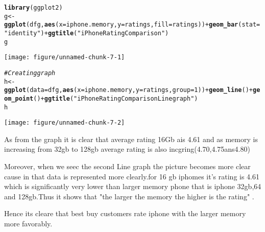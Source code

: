 \documentclass{article}\usepackage[]{graphicx}\usepackage[]{color}
\makeatletter
\def\maxwidth{ %
  \ifdim\Gin@nat@width>\linewidth
    \linewidth
  \else
    \Gin@nat@width
  \fi
}
\newcommand{\hlnum}[1]{\textcolor[rgb]{0.686,0.059,0.569}{#1}}%
\newcommand{\hlstr}[1]{\textcolor[rgb]{0.192,0.494,0.8}{#1}}%
\newcommand{\hlcom}[1]{\textcolor[rgb]{0.678,0.584,0.686}{\textit{#1}}}%
\newcommand{\hlopt}[1]{\textcolor[rgb]{0,0,0}{#1}}%
\newcommand{\hlstd}[1]{\textcolor[rgb]{0.345,0.345,0.345}{#1}}%
\newcommand{\hlkwb}[1]{\textcolor[rgb]{0.69,0.353,0.396}{#1}}%
\newcommand{\hlkwc}[1]{\textcolor[rgb]{0.333,0.667,0.333}{#1}}%
\newcommand{\hlkwd}[1]{\textcolor[rgb]{0.737,0.353,0.396}{\textbf{#1}}}%
\newenvironment{kframe}{%
 \def\at@end@of@kframe{}%
 \ifinner\ifhmode%
  \def\at@end@of@kframe{\end{minipage}}%
  \begin{minipage}{\columnwidth}%
 \fi\fi%
 \def\FrameCommand##1{\hskip\@totalleftmargin \hskip-\fboxsep
 \colorbox{shadecolor}{##1}\hskip-\fboxsep
     \hskip-\linewidth \hskip-\@totalleftmargin \hskip\columnwidth}%
 \MakeFramed {\advance\hsize-\width
   \@totalleftmargin\z@ \linewidth\hsize
   \@setminipage}}%
 {\par\unskip\endMakeFramed%
 \at@end@of@kframe}
\newenvironment{knitrout}{}{} %
\makeatother
\begin{document}
\begin{knitrout}
\color{fgcolor}\begin{kframe}
\begin{alltt}
\hlkwd{library}\hlstd{(ggplot2)}
\hlstd{g}\hlkwb{<-}\hlkwd{ggplot}\hlstd{(dfg,}\hlkwd{aes}\hlstd{(}\hlkwc{x}\hlstd{=iphone.memory,}\hlkwc{y}\hlstd{=ratings,}\hlkwc{fill}\hlstd{=ratings))}\hlopt{+}\hlkwd{geom_bar}\hlstd{(}\hlkwc{stat}\hlstd{=}\hlstr{"identity"}\hlstd{)}\hlopt{+}\hlkwd{ggtitle}\hlstd{(}\hlstr{"iPhone Rating Comparison"}\hlstd{)}
\hlstd{g}
\end{alltt}
\end{kframe}
\texttt{[image: figure/unnamed-chunk-7-1]} 
\begin{kframe}\begin{alltt}
\hlcom{#Creating graph}
\hlstd{h}\hlkwb{<-}\hlkwd{ggplot}\hlstd{(}\hlkwc{data}\hlstd{=dfg,} \hlkwd{aes}\hlstd{(}\hlkwc{x}\hlstd{=iphone.memory,} \hlkwc{y}\hlstd{=ratings,} \hlkwc{group}\hlstd{=}\hlnum{1}\hlstd{))} \hlopt{+}\hlkwd{geom_line}\hlstd{()} \hlopt{+} \hlkwd{geom_point}\hlstd{()}\hlopt{+}\hlkwd{ggtitle}\hlstd{(}\hlstr{"iPhone Rating Comparison Line graph"}\hlstd{)}
\hlstd{h}
\end{alltt}
\end{kframe}
\texttt{[image: figure/unnamed-chunk-7-2]} 

\end{knitrout}
As from the graph it is clear that average rating 16Gb ais 4.61 and 
as memory is increasing from 32gb to 128gb average rating is also incgring(4.70,4.75ans4.80)
\par Moreover, when we seec the second Line graph the picture becomes more clear cause in that 
data is represented more clearly.for 16 gb iphomes it's rating is 4.61 which is significantly very lower than larger memory phone that is iphone 32gb,64 and 128gb.Thus it shows that "the larger the memory the higher is the rating" .
\par 
Hence its cleare that best buy customers rate iphone with the larger memory more favorably.
\end{document}
